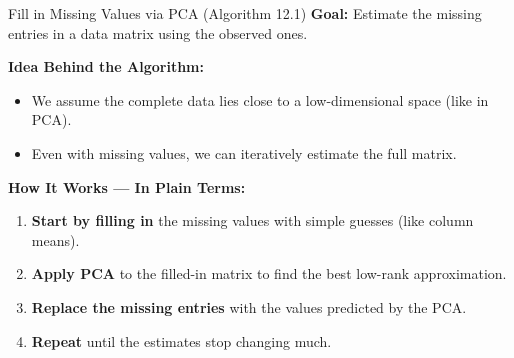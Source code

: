\documentclass[aspectratio=169,xcolor=dvipsnames]{beamer}
\begin{document}
\begin{frame}{Fill in Missing Values via PCA (Algorithm 12.1)}
  \textbf{Goal:} Estimate the missing entries in a data matrix using the observed ones.

  \vspace{0.3cm}
  \textbf{Idea Behind the Algorithm:}
  \begin{itemize}
    \item We assume the complete data lies close to a low-dimensional space (like in PCA).
    \item Even with missing values, we can iteratively estimate the full matrix.
  \end{itemize}

  \vspace{0.3cm}
  \textbf{How It Works — In Plain Terms:}
  \begin{enumerate}
    \item \textbf{Start by filling in} the missing values with simple guesses (like column means).
    \item \textbf{Apply PCA} to the filled-in matrix to find the best low-rank approximation.
    \item \textbf{Replace the missing entries} with the values predicted by the PCA.
    \item \textbf{Repeat} until the estimates stop changing much.
  \end{enumerate}
\end{frame}
\end{document}
